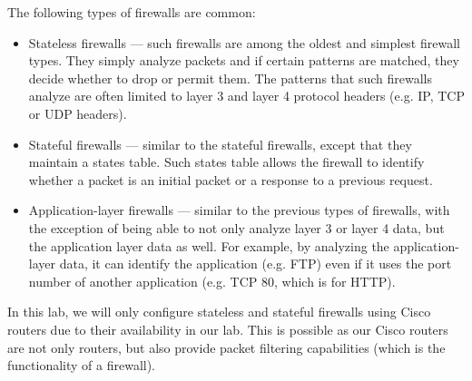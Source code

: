 \documentclass[pdftex,12pt,a4paper]{article}
\begin{document}
        The following types of firewalls are common:
        \begin{itemize}
            \item Stateless firewalls --- such firewalls are among the oldest
                and simplest firewall types. They simply analyze packets and if
                certain patterns are matched, they decide whether to drop or
                permit them. The patterns that such firewalls analyze are often
                limited to layer 3 and layer 4 protocol headers (e.g. IP, TCP
                or UDP headers).
            \item Stateful firewalls --- similar to the stateful firewalls,
                except that they maintain a states table. Such states table
                allows the firewall to identify whether a packet is an initial
                packet or a response to a previous request.
            \item Application-layer firewalls --- similar to the previous types
                of firewalls, with the exception of being able to not only
                analyze layer 3 or layer 4 data, but the application layer data
                as well. For example, by analyzing the application-layer data,
                it can identify the application (e.g. FTP) even if it uses the
                port number of another application (e.g. TCP 80, which is for
                HTTP).
        \end{itemize}

        In this lab, we will only configure stateless and stateful firewalls
        using Cisco routers due to their availability in our lab. This is
        possible as our Cisco routers are not only routers, but also provide
        packet filtering capabilities (which is the functionality of a
        firewall).
\end{document}

